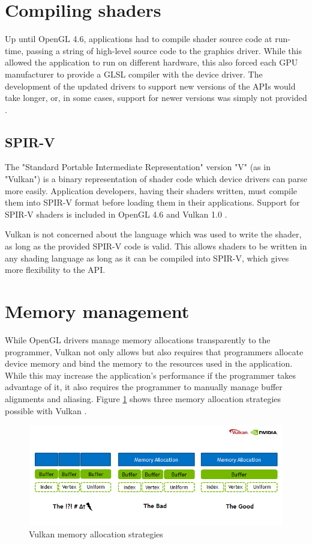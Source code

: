\section{Compiling shaders}
Up until OpenGL 4.6, applications had to compile shader source code at run-time, passing a string of high-level source code to the graphics driver. While this allowed the application to run on different hardware, this also forced each GPU manufacturer to provide a GLSL compiler with the device driver. The development of the updated drivers to support new versions of the APIs would take longer, or, in some cases, support for newer versions was simply not provided \cite{apple_nopengl}.

\subsection{SPIR-V}
The "Standard Portable Intermediate Representation" version "V" (as in "Vulkan") is a binary representation of shader code which device drivers can parse more easily. Application developers, having their shaders written, must compile them into SPIR-V format before loading them in their applications. Support for SPIR-V shaders is included in OpenGL 4.6 and Vulkan 1.0 \cite{spirv_spec}.

Vulkan is not concerned about the language which was used to write the shader, as long as the provided SPIR-V code is valid. This allows shaders to be written in any shading language as long as it can be compiled into SPIR-V, which gives more flexibility to the API.

\section{Memory management}
While OpenGL drivers manage memory allocations transparently to the programmer, Vulkan not only allows but also requires that programmers allocate device memory and bind the memory to the resources used in the application. While this may increase the application's performance if the programmer takes advantage of it, it also requires the programmer to manually manage buffer alignments and aliasing. Figure \ref{fig:vulkan_mem_alloc} shows three memory allocation strategies possible with Vulkan \cite{vulkan_mem_mgmt}.

\begin{figure}[ht]
    \caption{Vulkan memory allocation strategies}
    \begin{center}
        \includegraphics[width = 15cm]{figs/vulkan_memory_strategy.png}
    \end{center}
    \label{fig:vulkan_mem_alloc}
\end{figure}

